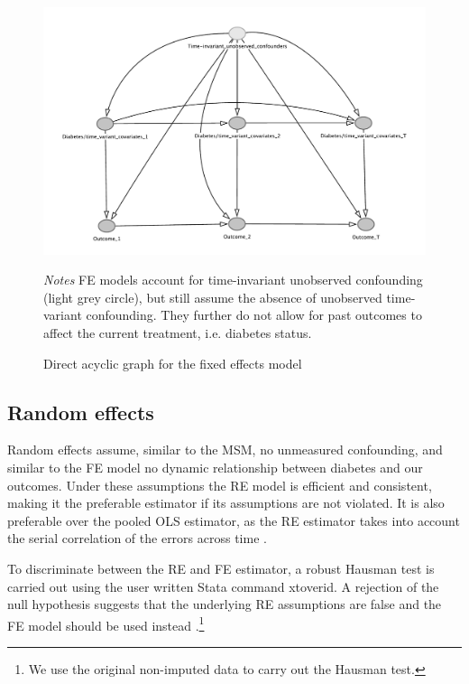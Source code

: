 \begin{figure}
\begin{center}
\caption{\label{fig:DAG_fe} Direct acyclic graph for the fixed effects model}
\includegraphics[scale=0.5]{Chapter5/DAG/dag_fe_alt}
\end{center}
\footnotesize{\textit{Notes} \ac{FE} models account for time-invariant unobserved confounding (light grey circle), but still assume the absence of unobserved time-variant confounding. They further do not allow for past outcomes to affect the current treatment, i.e. diabetes status. }
\end{figure}

\subsection{Random effects}

Random effects assume, similar to the \ac{MSM}, no unmeasured confounding, and similar to the \ac{FE} model no dynamic relationship between diabetes and our outcomes. Under these assumptions the \ac{RE} model is efficient and consistent, making it the preferable estimator if its assumptions are not violated. It is also preferable over the pooled \ac{OLS} estimator, as the \ac{RE} estimator takes into account the serial correlation of the errors across time \parencite{Wooldridge2012}. 

To discriminate between the \ac{RE} and \ac{FE} estimator, a robust Hausman test is carried out using the user written Stata command xtoverid. A rejection of the null hypothesis suggests that the underlying \ac{RE} assumptions are false and the \ac{FE} model should be used instead \parencite{Wooldridge2012}.\footnote{We use the original non-imputed data to carry out the Hausman test.} 



